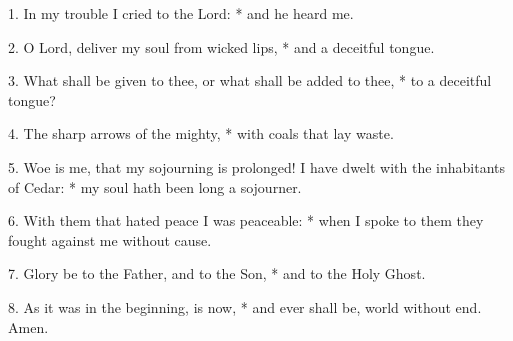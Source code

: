 1. In my trouble I cried to the Lord: * and he heard me.

2. O Lord, deliver my soul from wicked lips, * and a deceitful tongue.

3. What shall be given to thee, or what shall be added to thee, * to a deceitful tongue?

4. The sharp arrows of the mighty, * with coals that lay waste.

5. Woe is me, that my sojourning is prolonged! I have dwelt with the inhabitants of Cedar: * my soul hath been long a sojourner.

6. With them that hated peace I was peaceable: * when I spoke to them they fought against me without cause.

7. Glory be to the Father, and to the Son, * and to the Holy Ghost.

8. As it was in the beginning, is now, * and ever shall be, world without end. Amen.
